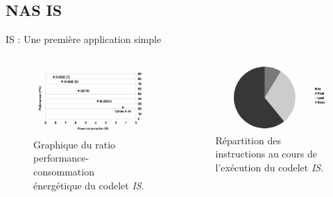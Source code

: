 \documentclass{beamer}
\begin{document}
\subsection{NAS IS}
\begin{frame}{IS : Une première application simple}

\begin{columns}

\begin{column}{0.4\paperwidth}
\begin{figure}
\centering
\includegraphics[width=\textwidth]{IS.eps}
\caption{\label{IS}Graphique du ratio performance-consommation énergétique du codelet \textit{IS}.}
\end{figure}
\end{column}

\begin{column}{0.4\paperwidth}
\begin{figure}
\centering
\includegraphics[width=\textwidth]{IS_instr.eps}
\caption{\label{IS_instr}Répartition des instructions au cours de l'exécution du codelet \textit{IS}.}
\end{figure}
\end{column}

\end{columns}

\end{frame}
\end{document}
